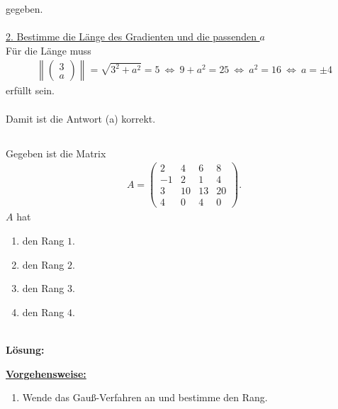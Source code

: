 gegeben.\\
\\
\underline{2. Bestimme die Länge des Gradienten und die passenden $ a $}\\
 Für die Länge muss 
\begin{align*}
\left\| \begin{pmatrix}
3 \\ a
\end{pmatrix} 
\right\| = \sqrt{3^2 + a^2} = 5
\ \Leftrightarrow \
9 + a^2 = 25 
\ \Leftrightarrow \
a^2 = 16 
\ \Leftrightarrow \
a = \pm 4
\end{align*}
erfüllt sein.\\
\\
Damit ist die Antwort (a) korrekt.
\newpage
\subsection*{}
Gegeben ist die Matrix
\begin{align*}
A =
\begin{pmatrix}
2 & 4 & 6 & 8 \\
-1 & 2 & 1 & 4 \\
3 & 10 & 13 &  20 \\
4 & 0 & 4 & 0
\end{pmatrix}.
\end{align*}
$ A $ hat
\renewcommand{\labelenumi}{(\alph{enumi})}
\begin{enumerate}
	\item 
	den Rang $ 1 $.
	\item 
	den Rang $ 2 $.
	\item
	den Rang $ 3 $.
	\item
	den Rang $ 4 $.
\end{enumerate}
\ \\
\textbf{Lösung:}
\begin{mdframed}
\underline{\textbf{Vorgehensweise:}}
\renewcommand{\labelenumi}{\theenumi.}
\begin{enumerate}
\item 
Wende das Gauß-Verfahren an und bestimme den Rang.
\end{enumerate}
\end{mdframed}

